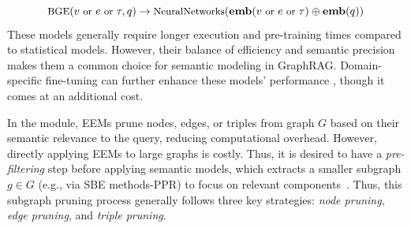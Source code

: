 {\begin{equation*}
\small
\text{BGE}(v \text{ or } e \text{ or } \tau, q) \to \text{NeuralNetworks}(\mathbf{emb}(v \text{ or } e \text{ or } \tau) \oplus \mathbf{emb}(q))
\end{equation*}
These models generally require longer execution and pre-training times compared to statistical models. However, their balance of efficiency and semantic precision makes them a common choice for semantic modeling in  GraphRAG. 
Domain-specific fine-tuning can further enhance these models' performance {\cite{RoG,ref:kelp,LessIsMore,GCR}}, though it comes at an additional cost. %




{\it {}}
In the {\preRetrieval} module, EEMs prune nodes, edges, or triples from graph $G$ based on their semantic relevance to the query, 
reducing computational overhead.
However, directly applying EEMs to large graphs is costly. 
Thus, it is desired to have a \textit{pre-filtering} step before applying semantic models, which extracts a smaller subgraph \( g \in G \) (e.g., via SBE methods-PPR) to focus on relevant components~\cite{ref:kelp,LessIsMore}. 
Thus, this subgraph pruning process generally follows three key strategies: {\it node pruning}, {\it edge pruning}, and {\it triple pruning}.





}
